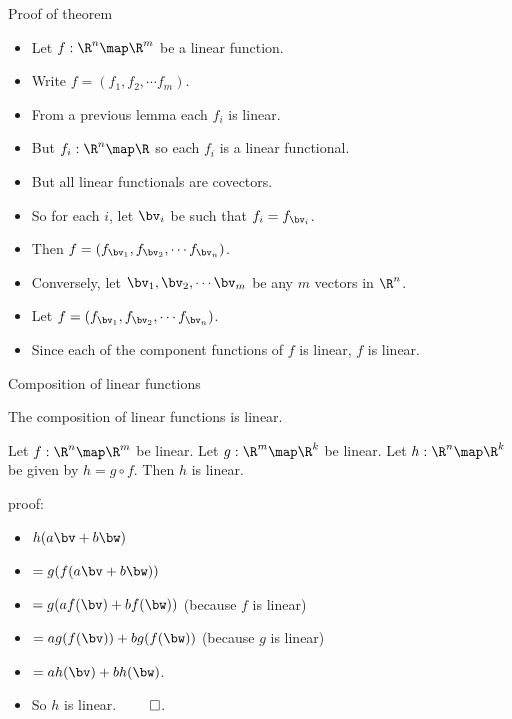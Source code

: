 \documentclass{beamer}
\begin{document}
\begin{frame}{Proof of theorem}

\begin{itemize}
\item Let $f:\R^n\map\R^m$ be a linear function.
\item Write $f = (f_1, f_2, \cdots f_m)$.
\item From a previous lemma each $f_i$ is linear.
\item But $f_i:\R^n\map\R$ so each $f_i$ is a linear functional.
\item But all linear functionals are covectors.
\item So for each $i$, let $\bv_i$ be such that $f_i = f_{\bv_i}$.
\item Then $f=(f_{\bv_1}, f_{\bv_2},\cdots f_{\bv_n})$.
\item Conversely, let $\bv_1,\bv_2,\cdots\bv_m$ be any $m$ vectors in $\R^n$.
\item Let $f=(f_{\bv_1}, f_{\bv_2},\cdots f_{\bv_n})$.
\item Since each of the component functions of $f$ is linear, $f$ is linear.
\end{itemize}


\end{frame}


\begin{frame}{Composition of linear functions}

The composition of linear functions is linear.

\pause

\begin{lemma}
Let $f:\R^n\map\R^m$ be linear. Let $g:\R^m\map\R^k$ be linear.
Let $h:\R^n\map\R^k$ be given by $h=g\circ f$.
\pause
Then $h$ is linear.
\end{lemma}

\pause

proof:

\begin{itemize}
\item $h(a\bv +b\bw)$
\item $= g(f(a\bv +b\bw))$
\item $= g(a f(\bv) + b f(\bw))$ \quad (because $f$ is linear)
\item $= a g(f(\bv)) + b g(f(\bw))$ \quad (because $g$ is linear)
\item $= a h(\bv) + b h(\bw)$.
\item So $h$ is linear. $\qed$.
\end{itemize}


\end{frame}
\end{document}
